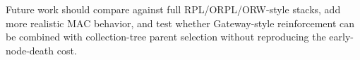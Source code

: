 \documentclass[conference]{IEEEtran}
\begin{document}
Future work should compare against full RPL/ORPL/ORW-style stacks, add more realistic MAC behavior, and test whether Gateway-style reinforcement can be combined with collection-tree parent selection without reproducing the early-node-death cost.

\FloatBarrier
\balance


\end{document}
